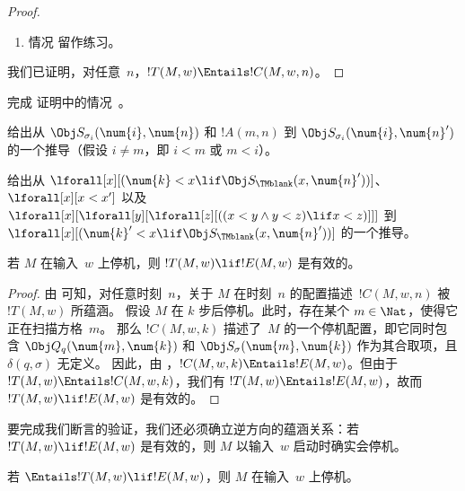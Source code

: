 \documentclass[../../../include/open-logic-section]{subfiles}
\begin{document}
\begin{proof}
\begin{enumerate}
\item 情况  留作练习。
\end{enumerate}
我们已证明，对任意~$n$，$!T(M, w) \Entails !C(M, w, n)$。
\end{proof}

\begin{prob}
完成  证明中的情况~。
\end{prob}

\begin{prob}
给出从
$\Obj S_{\sigma_i}(\num{i}, \num{n})$ 和 $!A(m, n)$ 到 $\Obj S_{\sigma_i}(\num{i}, \num{n}')$ 的一个推导（假设 $i \neq
m$，即 $i < m$ 或 $m < i$）。
\end{prob}

\begin{prob}
给出从 $\lforall[x][(\num{k} < x \lif \Obj
  S_\TMblank(x, \num{n}'))]$、$\lforall[x][x < x']$ 以及
$\lforall[x][\lforall[y][\lforall[z][ ((x < y \land y < z) \lif x <
      z)]]]$ 到 $\lforall[x][(\num{k}' < x \lif \Obj
  S_\TMblank(x, \num{n}'))]$ 的一个推导。
\end{prob}

\begin{lem}
若 $M$ 在输入~$w$ 上停机，则 $!T(M, w) \lif
!E(M, w)$ 是有效的。
\end{lem}

\begin{proof}
由  可知，对任意时刻~$n$，关于 $M$ 在时刻~$n$ 的配置描述~$!C(M, w, n)$ 被~$!T(M, w)$ 所蕴涵。
假设 $M$ 在 $k$ 步后停机。此时，存在某个 $m \in \Nat$，使得它正在扫描方格~$m$。
那么 $!C(M, w, k)$ 描述了~$M$ 的一个停机配置，即它同时包含 $\Obj Q_q(\num{m}, \num{k})$ 和 $\Obj
S_\sigma(\num{m}, \num{k})$ 作为其合取项，且 $\delta(q,\sigma)$ 无定义。
因此，由 ，$!C(M, w, k) \Entails !E(M,
w)$。但由于 $!T(M, w) \Entails !C(M, w, k)$，我们有 $!T(M, w)
\Entails !E(M, w)$，故而 $!T(M, w) \lif !E(M, w)$ 是有效的。
\end{proof}

\begin{explain}
要完成我们断言的验证，我们还必须确立逆方向的蕴涵关系：若 $!T(M, w) \lif !E(M, w)$ 是有效的，则
$M$ 以输入~$w$ 启动时确实会停机。
\end{explain}

\begin{lem}
若 $\Entails !T(M, w) \lif !E(M, w)$，则 $M$ 在输入~$w$ 上停机。
\end{lem}
\end{document}

